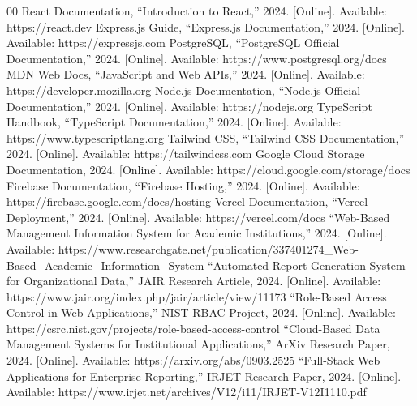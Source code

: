 \documentclass[conference]{IEEEtran}
\begin{document}
\begin{thebibliography}{00}
 React Documentation, ``Introduction to React,'' 2024. [Online]. Available: https://react.dev
 Express.js Guide, ``Express.js Documentation,'' 2024. [Online]. Available: https://expressjs.com
 PostgreSQL, ``PostgreSQL Official Documentation,'' 2024. [Online]. Available: https://www.postgresql.org/docs
 MDN Web Docs, ``JavaScript and Web APIs,'' 2024. [Online]. Available: https://developer.mozilla.org
 Node.js Documentation, ``Node.js Official Documentation,'' 2024. [Online]. Available: https://nodejs.org
 TypeScript Handbook, ``TypeScript Documentation,'' 2024. [Online]. Available: https://www.typescriptlang.org
 Tailwind CSS, ``Tailwind CSS Documentation,'' 2024. [Online]. Available: https://tailwindcss.com
 Google Cloud Storage Documentation, 2024. [Online]. Available: https://cloud.google.com/storage/docs
 Firebase Documentation, ``Firebase Hosting,'' 2024. [Online]. Available: https://firebase.google.com/docs/hosting
 Vercel Documentation, ``Vercel Deployment,'' 2024. [Online]. Available: https://vercel.com/docs
 ``Web-Based Management Information System for Academic Institutions,'' 2024. [Online]. Available: https://www.researchgate.net/publication/337401274\_Web-Based\_Academic\_Information\_System
 ``Automated Report Generation System for Organizational Data,'' JAIR Research Article, 2024. [Online]. Available: https://www.jair.org/index.php/jair/article/view/11173
 ``Role-Based Access Control in Web Applications,'' NIST RBAC Project, 2024. [Online]. Available: https://csrc.nist.gov/projects/role-based-access-control
 ``Cloud-Based Data Management Systems for Institutional Applications,'' ArXiv Research Paper, 2024. [Online]. Available: https://arxiv.org/abs/0903.2525
 ``Full-Stack Web Applications for Enterprise Reporting,'' IRJET Research Paper, 2024. [Online]. Available: https://www.irjet.net/archives/V12/i11/IRJET-V12I1110.pdf
\end{thebibliography}
\end{document}
